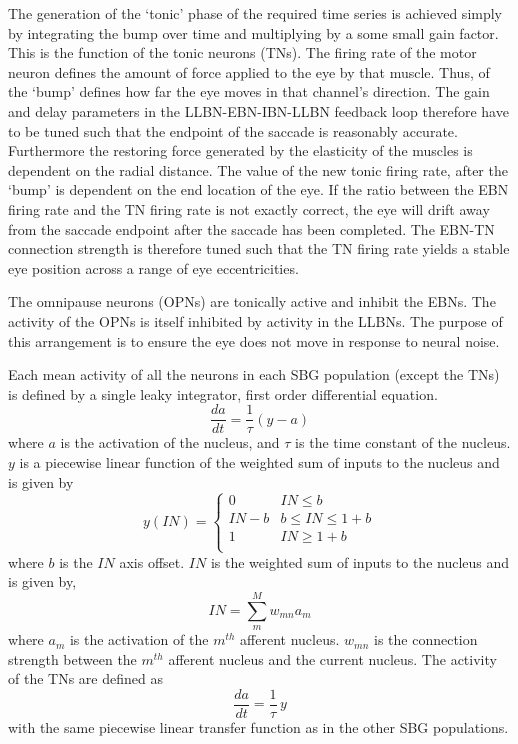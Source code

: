 \documentclass{frontiersSCNS}
\begin{document}
The generation of the `tonic' phase of the required time series is
achieved simply by integrating the bump over time and multiplying by a
some small gain factor.  This is the function of the tonic neurons
(TNs).  The firing rate of the motor neuron defines the amount of
force applied to the eye by that muscle.  Thus, 
of the `bump'
defines how far the eye moves in that channel's direction.  The gain
and delay parameters in the LLBN-EBN-IBN-LLBN feedback loop therefore
have to be tuned such that the endpoint of the saccade is reasonably
accurate.  Furthermore the restoring force generated by the elasticity
of the muscles is dependent on the radial distance.  The value of the
new tonic firing rate, after the `bump' is dependent on the end
location of the eye.  If the ratio between the EBN firing rate and the
TN firing rate is not exactly correct, the eye will drift away from
the saccade endpoint after the saccade has been completed.  The EBN-TN
connection strength is therefore tuned such that the TN firing rate
yields a stable eye position across a range of eye eccentricities.

The omnipause neurons (OPNs) are tonically active and inhibit the
EBNs.  The activity of the OPNs is itself inhibited by activity in the
LLBNs.  The purpose of this arrangement is to ensure the eye does not
move in response to neural noise.

Each mean activity of all the neurons in each SBG population (except
the TNs) is defined by a single leaky integrator, first order
differential equation.
\begin{equation}\label{eq:LIN}
   \frac{da}{dt} = \frac{1}{\tau}(y-a)
\end{equation}
where $a$ is the activation of the nucleus, and $\tau$ is the time
constant of the nucleus. $y$ is a piecewise linear function of the
weighted sum of inputs to the nucleus and is given by
\begin{equation}
       y(IN) = \begin{cases}
       0    & IN \leq b \\
      IN-b   & b \leq IN \leq 1+b \\
      1   & IN \geq 1+b \\
   \end{cases}
\end{equation}
where $b$ is the $IN$ axis offset.  $IN$ is the weighted sum of inputs
to the nucleus and is given by,
\begin{equation}
    IN = \sum_{m}^{M} w_{mn} a_{m}
\end{equation}
where $a_{m}$ is the activation of the $m^{th}$ afferent nucleus.
$w_{mn}$ is the connection strength between the $m^{th}$ afferent
nucleus and the current nucleus. The activity of the TNs are defined
as
\begin{equation}
   \frac{da}{dt} = \frac{1}{\tau}\,y
\end{equation}
with the same piecewise linear transfer function as in the other SBG
populations.
\end{document}
